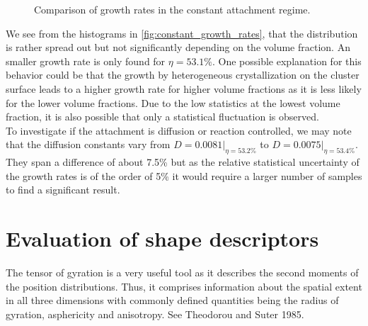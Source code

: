 \begin{figure}[h]
\begin{center}
 \hspace{0.5cm}
\caption[Constant attachment rate measurements from production data]{Comparison of growth rates in the constant attachment regime.}
\label{fig:constant_growth_rates}
\end{center}
\end{figure}

We see from the histograms in \autoref{fig:constant_growth_rates}, that the distribution is rather spread out but not significantly depending on the volume fraction. An smaller growth rate is only found for $\eta = 53.1\%$. One possible explanation for this behavior could be that the growth by heterogeneous crystallization on the cluster surface leads to a higher growth rate for higher volume fractions as it is less likely for the lower volume fractions. Due to the low statistics at the lowest volume fraction, it is also possible that only a statistical fluctuation is observed.\\ 

To investigate if the attachment is diffusion or reaction controlled, we may note that the diffusion constants vary from $D=0.0081|_{\eta = 53.2\%}$ to $D=0.0075|_{\eta = 53.4\%}$. They span a difference of about 7.5\% but as the relative statistical uncertainty of the growth rates is of the order of 5\% it would require a larger number of samples to find a significant result.

\section{Evaluation of shape descriptors}
\label{sec:tog}
The tensor of gyration is a very useful tool as it describes the second moments of the position distributions. Thus, it comprises information about the spatial extent in all three dimensions with commonly defined quantities being the radius of gyration, asphericity and anisotropy. See Theodorou and Suter 1985\cite{Theodorou1985}.\\

